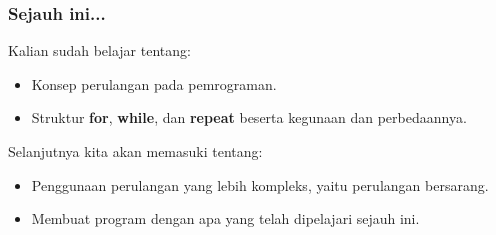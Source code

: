 \begin{frame}
\frametitle{Sejauh ini...}
Kalian sudah belajar tentang:
\begin{itemize}
  \item Konsep perulangan pada pemrograman.
  \item Struktur \textbf{for}, \textbf{while}, dan \textbf{repeat} beserta kegunaan dan perbedaannya.
\end{itemize}
Selanjutnya kita akan memasuki tentang:
\begin{itemize}
  \item Penggunaan perulangan yang lebih kompleks, yaitu perulangan bersarang.
  \item Membuat program dengan apa yang telah dipelajari sejauh ini.
\end{itemize}
\end{frame}


